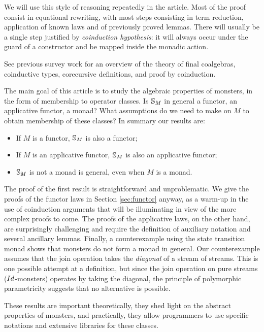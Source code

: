 We will use this style of reasoning repeatedly in the article.
Most of the proof consist in equational rewriting, with most steps consisting in term reduction, application of known laws and of previously proved lemmas.
There will usually be a single step justified by {\em coinduction hypothesis}: it will always occur under the guard of a constructor and be mapped inside the monadic action.

See previous survey work \cite{capretta:2011} for an overview of the theory of final coalgebras, coinductive types, corecursive definitions, and proof by coinduction.

The main goal of this article is to study the algebraic properties of monsters, in the form of membership to operator classes.
Is $\mathbb{S}_{M}$ in general a functor, an applicative functor, a monad?
What assumptions do we need to make on $M$ to obtain membership of these classes?
In summary our results are:
\begin{itemize}
\item If $M$ is a functor, $\mathbb{S}_{M}$ is also a functor;
\item If $M$ is an applicative functor, $\mathbb{S}_{M}$ is also an applicative functor;
\item $\mathbb{S}_{M}$ is not a monad is general, even when $M$ is a monad.
\end{itemize}

The proof of the first result is straightforward and unproblematic.
We give the proofs of the functor laws in Section \ref{sec:functor} anyway, as a warm-up in the use of coinduction arguments that will be illuminating in view of the more complex proofs to come.
The proofs of the applicative laws, on the other hand, are surprisingly challenging and require the definition of auxiliary notation and several ancillary lemmas.
Finally, a counterexample using the state transition monad shows that monsters do not form a monad in general. Our counterexample assumes that the join operation takes the {\em diagonal} of a stream of streams.
This is one possible attempt at a definition, but since the join operation on pure streams ($\Id$-monsters) operates by taking the diagonal, the principle of polymorphic parametricity suggests that no alternative is possible.

These results are important theoretically, they shed light on the abstract properties of monsters, and practically, they allow programmers to use specific notations and extensive libraries for these classes.
